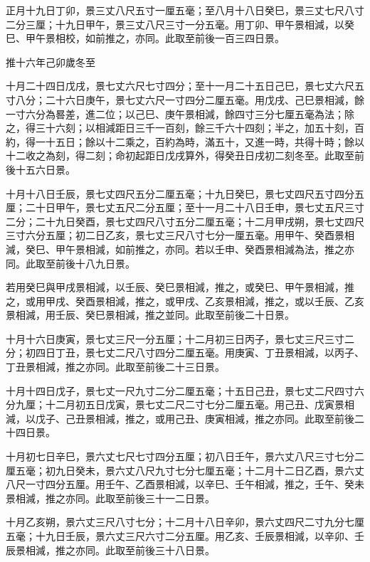 \begin{pinyinscope}
 正月十九日丁卯，景三丈八尺五寸一厘五毫；至八月十八日癸巳，景三丈七尺八寸二分三厘；十九日甲午，景三丈八尺三寸一分五毫。用丁卯、甲午景相減，以癸巳、甲午景相校，如前推之，亦同。此取至前後一百三四日景。



 推十六年己卯歲冬至



 十月二十四日戊戌，景七丈六尺七寸四分；至十一月二十五日己巳，景七丈六尺五寸八分；二十六日庚午，景七丈六尺一寸四分二厘五毫。用戊戌、己巳景相減，餘一寸六分為晷差，進二位；以己巳、庚午景相減，餘四寸三分七厘五毫為法；除之，得三十六刻；以相減距日三千一百刻，餘三千六十四刻；半之，加五十刻，百約，得一十五日；餘以十二乘之，百約為時，滿五十，又進一時，共得十時；餘以十二收之為刻，得二刻；命初起距日戊戌算外，得癸丑日戌初二刻冬至。此取至前後十五六日景。



 十月十八日壬辰，景七丈四尺五分二厘五毫；十九日癸巳，景七丈四尺五寸四分五厘；二十日甲午，景七丈五尺二分五厘；至十一月二十八日壬申，景七丈五尺三寸二分；二十九日癸酉，景七丈四尺八寸五分二厘五毫；十二月甲戌朔，景七丈四尺三寸六分五厘；初二日乙亥，景七丈三尺八寸七分一厘五毫。用甲午、癸酉景相減，癸巳、甲午景相減，如前推之，亦同。若以壬申、癸酉景相減為法，推之亦同。此取至前後十八九日景。



 若用癸巳與甲戌景相減，以壬辰、癸巳景相減，推之，或癸巳、甲午景相減，推之，或用甲戌、癸酉景相減，推之，或甲戌、乙亥景相減，推之，或以壬辰、乙亥景相減，用壬辰、癸巳景相減，推之並同。此取至前後二十日景。



 十月十六日庚寅，景七丈三尺一分五厘；十二月初三日丙子，景七丈三尺三寸二分；初四日丁丑，景七丈二尺八寸四分二厘五毫。用庚寅、丁丑景相減，以丙子、丁丑景相減，推之亦同。此取至前後二十三日景。



 十月十四日戊子，景七丈一尺九寸二分二厘五毫；十五日己丑，景七丈二尺四寸六分九厘；十二月初五日戊寅，景七丈二尺二寸七分二厘五毫。用己丑、戊寅景相減，以戊子、己丑景相減，推之，或用己丑、庚寅相減，推之亦同。此取至前後二十四日景。



 十月初七日辛巳，景六丈七尺七寸四分五厘；初八日壬午，景六丈八尺三寸七分二厘五毫；初九日癸未，景六丈八尺九寸七分七厘五毫；十二月十二日乙酉，景六丈八尺一寸四分五厘。用壬午、乙酉景相減，以辛巳、壬午相減，推之，壬午、癸未景相減，推之亦同。此取至前後三十一二日景。



 十月乙亥朔，景六丈三尺八寸七分；十二月十八日辛卯，景六丈四尺二寸九分七厘五毫；十九日壬辰，景六丈三尺六寸二分五厘。用乙亥、壬辰景相減，以辛卯、壬辰景相減，推之亦同。此取至前後三十八日景。




\end{pinyinscope}
